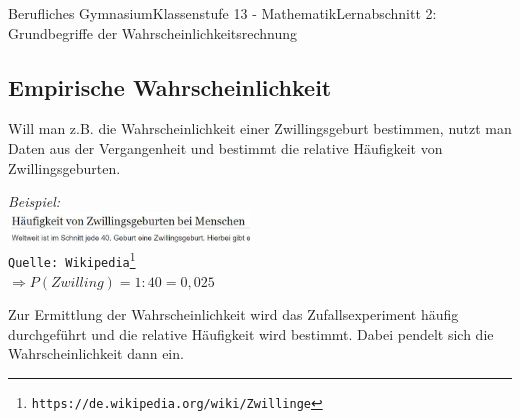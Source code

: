\documentclass[11pt,twocolumn,oneside,openany,headings=optiontotoc,11pt,numbers=noenddot]{article}
\begin{document}
\begin{worksheet}{Berufliches Gymnasium}{Klassenstufe 13 - Mathematik}{Lernabschnitt 2: Grundbegriffe der Wahrscheinlichkeitsrechnung}
		\subsection{Empirische Wahrscheinlichkeit}
		Will man z.B. die Wahrscheinlichkeit einer Zwillingsgeburt bestimmen, nutzt man Daten aus der Vergangenheit und bestimmt die relative Häufigkeit von Zwillingsgeburten.\\
		\par
		\setlength{\leftskip}{0.5cm}
		\par\noindent
		\textit{Beispiel:}\\
		\includegraphics[width=0.48\textwidth]{../99_Bilder/04_WKR/zwillinge.jpg}\\
		\footnotesize{\texttt{Quelle: Wikipedia\footnote{https://de.wikipedia.org/wiki/Zwillinge}}}\\
		\normalsize
		\(\Rightarrow P(Zwilling) = 1:40 = 0,025\)\\
		\par
		\setlength{\leftskip}{0cm}
		\par\noindent
		Zur Ermittlung der Wahrscheinlichkeit wird das Zufallsexperiment häufig durchgeführt und die relative Häufigkeit wird bestimmt. Dabei \grqq{}pendelt\grqq{} sich die Wahrscheinlichkeit dann ein.

\end{worksheet}
\end{document}
